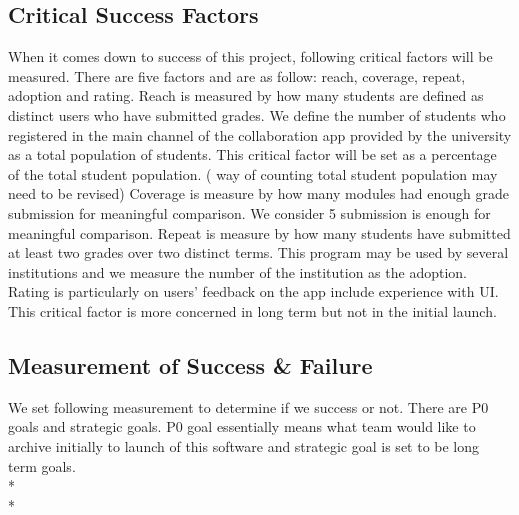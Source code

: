 \subsection{Critical Success Factors}
    \noindent When it comes down to success of this project,  following critical factors will be measured. There are five factors and are as follow: reach, coverage, repeat, adoption and rating.  
    Reach is measured by how many students are defined as distinct users who have submitted grades. We define the number of students who registered in the main channel of the collaboration app provided by the university as a total population of students. This critical factor will be set as a percentage of the total student population. ( way of counting total student population may need to be revised) 
    Coverage is measure by how many modules had enough grade submission for meaningful comparison. We consider 5 submission is enough for meaningful comparison. Repeat is measure by how many students have submitted at least two grades over two distinct terms. This program may be used by several institutions and we measure the number of the institution as the adoption. Rating is particularly on users’ feedback on the app include experience with UI. This critical factor is more concerned in long term but not in the initial launch. 

\subsection{Measurement of Success \& Failure}
\noindent We set following measurement to determine if we success or not. There are P0 goals  and strategic goals. P0 goal essentially means what team would like to archive initially to launch of this software and strategic goal is set to be long term goals. \\* \\*

